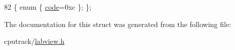 \begin{DoxyCode}
82 \{ \textcolor{keyword}{enum} \{ \hyperlink{struct_l_v_data_type_3_01std_1_1complex_3_01float_01_4_01_4_a983dcb40a3811e9332e53a232710a186ad41fe13f2836af351e6b0113f1d90f35}{code}=0xc \}; \};
\end{DoxyCode}


The documentation for this struct was generated from the following file\+:\begin{DoxyCompactItemize}
\item 
cputrack/\hyperlink{labview_8h}{labview.\+h}\end{DoxyCompactItemize}
